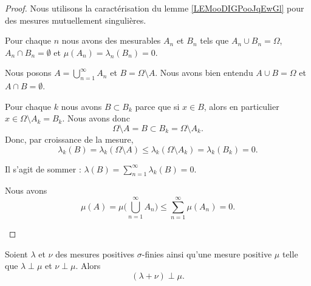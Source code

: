 \begin{proof}
	Nous utilisons la caractérisation du lemme \ref{LEMooDIGPooJqEwGl} pour des mesures mutuellement singulières.

	Pour chaque \( n\) nous avons des mesurables \( A_n\) et \( B_n\) tels que \( A_n\cup B_n=\Omega\), \( A_n\cap B_n=\emptyset\) et \( \mu(A_n)=\lambda_n(B_n)=0\).

	Nous posons \( A=\bigcup_{n=1}^{\infty}A_n\) et \( B=\Omega\setminus A\). Nous avons bien entendu \( A\cup B=\Omega\) et \( A\cap B=\emptyset\).
	\begin{subproof}
		\spitem[\( \lambda_k(B)=0\) pour tout \( k\)]
		Pour chaque \( k\) nous avons \( B\subset B_k\) parce que si \( x\in B\), alors en particulier \( x\in \Omega\setminus A_k=B_k\). Nous avons donc
		\begin{equation}
			\Omega\setminus A=B\subset B_k=\Omega\setminus A_k.
		\end{equation}
		Donc, par croissance de la mesure,
		\begin{equation}
			\lambda_k(B)=\lambda_k(\Omega\setminus A)\leq \lambda_k(\Omega\setminus A_k)=\lambda_k(B_k)=0.
		\end{equation}

		\spitem[\( \lambda(B)=0\)]
		Il s'agit de sommer : \( \lambda(B)=\sum_{n=1}^{\infty}\lambda_k(B)=0\).

		\spitem[\( \mu(A)=0\)]
		Nous avons
		\begin{equation}
			\mu(A)=\mu\Big( \bigcup_{n=1}^{\infty}A_n \Big)\leq \sum_{n=1}^{\infty}\mu(A_n)=0.
		\end{equation}
	\end{subproof}
\end{proof}

\begin{lemma}		\label{LEMooYYIIooCUfGxA}
	Soient \( \lambda\) et \( \nu\) des mesures positives \( \sigma\)-finies ainsi qu'une mesure positive \( \mu\) telle que \( \lambda\perp \mu\) et \( \nu\perp \mu\). Alors
	\begin{equation}
		(\lambda+\nu)\perp\mu.
	\end{equation}
\end{lemma}

